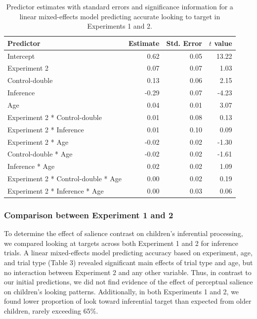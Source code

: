 \documentclass[a4paper,man,apacite,floatsintext]{apa6}
\begin{document}
\begin{table}[tb]
\centering
\begin{tabular}{lrrr}
 Predictor & Estimate & Std. Error & $t$ value \\ 
  \hline
Intercept & 0.62 & 0.05 & 13.22 \\ 
  Experiment 2 & 0.07 & 0.07 & 1.03 \\ 
  Control-double & 0.13 & 0.06 & 2.15 \\ 
  Inference & -0.29 & 0.07 & -4.23 \\ 
  Age & 0.04 & 0.01 & 3.07 \\ 
  Experiment 2 * Control-double & 0.01 & 0.08 & 0.13 \\ 
  Experiment 2 * Inference & 0.01 & 0.10 & 0.09 \\ 
  Experiment 2 * Age & -0.02 & 0.02 & -1.30 \\ 
  Control-double * Age & -0.02 & 0.02 & -1.61 \\ 
  Inference * Age & 0.02 & 0.02 & 1.09 \\ 
  Experiment 2 * Control-double * Age & 0.00 & 0.02 & 0.19 \\ 
  Experiment 2 * Inference * Age & 0.00 & 0.03 & 0.06 \\ 
   \hline
\end{tabular}
\caption{Predictor estimates with standard errors and significance information for a linear mixed-effects model predicting accurate looking to target in Experiments 1 and 2.} 
\label{tab:exp2_tab}
\end{table}

\subsubsection{Comparison between Experiment 1 and
2}\label{comparison-between-experiment-1-and-2}

To determine the effect of salience contrast on children's inferential
processing, we compared looking at targets across both Experiment 1 and
2 for inference trials. A linear mixed-effects model predicting accuracy
based on experiment, age, and trial type (Table 3) revealed significant
main effects of trial type and age, but no interaction between
Experiment 2 and any other variable. Thus, in contrast to our initial
predictions, we did not find evidence of the effect of perceptual
salience on children's looking patterns. Additionally, in both
Experiments 1 and 2, we found lower proportion of look toward
inferential target than expected from older children, rarely exceeding
65\%.
\end{document}

